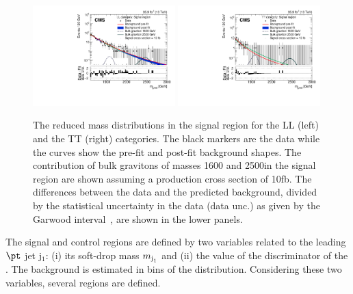 \begin{figure}
\centering
\includegraphics[width=0.49\textwidth]{B2G-16-026/Figure_008-a.pdf}
\includegraphics[width=0.49\textwidth]{B2G-16-026/Figure_008-b.pdf}
\caption{The reduced mass \mjjs distributions in the signal region for the LL
  (left) and the TT (right) categories. The black markers are the data
  while the curves show the pre-fit and post-fit background
  shapes. The contribution of bulk gravitons of masses 1600 and
  2500\GeV in the signal region are shown assuming a production cross
  section of 10\unit{fb}.
  The differences between the data and the predicted
  background, divided by the statistical uncertainty in the data
  (data unc.) as given by the Garwood interval~\cite{Garwood}, are shown in the lower panels.
  }
\label{fig:AABH_SR}
\end{figure}

The signal and control regions are defined by two variables related to the leading $\pt$ jet j$_{1}$: (i) its soft-drop mass $m_{\text{j}_{1}}$ and (ii) the value of the discriminator of the \Hbbt. The background is estimated in bins
of the \mjjs distribution. Considering these two variables, several regions are defined.

